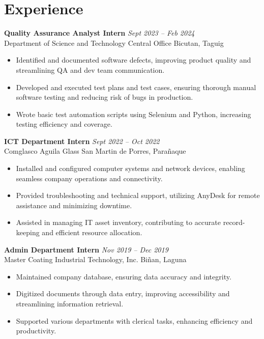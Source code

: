 \documentclass[a4paper, 10pt]{article}
\begin{document}
\section*{Experience}
\noindent \textbf{Quality Assurance Analyst Intern} \hfill \textit{Sept 2023 – Feb 2024} \\
Department of Science and Technology Central Office \hfill Bicutan, Taguig
\begin{itemize}[leftmargin=0.5in]
  \item Identified and documented software defects, improving product quality and streamlining QA and dev team communication.
  \item Developed and executed test plans and test cases, ensuring thorough manual software testing and reducing risk of bugs in production.
  \item Wrote basic test automation scripts using Selenium and Python, increasing testing efficiency and coverage.
\end{itemize}
\noindent \textbf{ICT Department Intern} \hfill \textit{Sept 2022 – Oct 2022} \\
Comglasco Aguila Glass \hfill San Martin de Porres, Parañaque
\begin{itemize}[leftmargin=0.5in]
  \item Installed and configured computer systems and network devices, enabling seamless company operations and connectivity.
  \item Provided troubleshooting and technical support, utilizing AnyDesk for remote assistance and minimizing downtime.
  \item Assisted in managing IT asset inventory, contributing to accurate record-keeping and efficient resource allocation.
\end{itemize}
\noindent \textbf{Admin Department Intern} \hfill \textit{Nov 2019 – Dec 2019} \\
Master Coating Industrial Technology, Inc. \hfill Biñan, Laguna
\begin{itemize}[leftmargin=0.5in]
  \item Maintained company database, ensuring data accuracy and integrity.
  \item Digitized documents through data entry, improving accessibility and streamlining information retrieval.
  \item Supported various departments with clerical tasks, enhancing efficiency and productivity.
\end{itemize}

\vspace{-1.5em}
\end{document}
